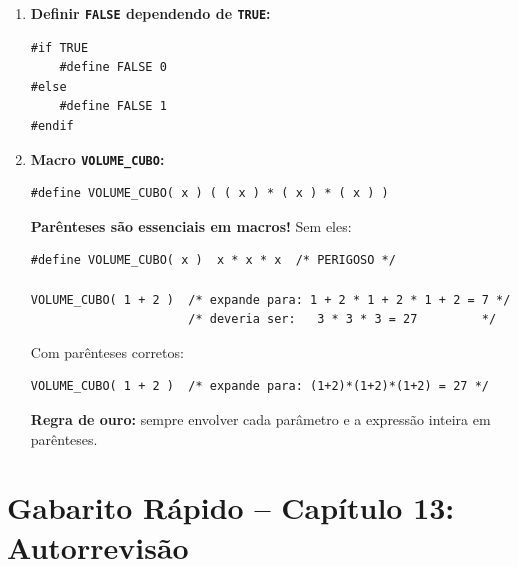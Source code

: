 \documentclass[12pt,a4paper]{article}
\begin{document}
\begin{respostabox}
\begin{enumerate}[label=\textbf{\alph*)}]
\item \textbf{Definir \texttt{FALSE} dependendo de \texttt{TRUE}:}
\begin{lstlisting}
#if TRUE
    #define FALSE 0
#else
    #define FALSE 1
#endif
\end{lstlisting}

\item \textbf{Macro \texttt{VOLUME\_CUBO}:}
\begin{lstlisting}
#define VOLUME_CUBO( x ) ( ( x ) * ( x ) * ( x ) )
\end{lstlisting}

\begin{erroco}
  \textbf{Parênteses são essenciais em macros!} Sem eles:
\begin{lstlisting}
#define VOLUME_CUBO( x )  x * x * x  /* PERIGOSO */

VOLUME_CUBO( 1 + 2 )  /* expande para: 1 + 2 * 1 + 2 * 1 + 2 = 7 */
                      /* deveria ser:   3 * 3 * 3 = 27         */
\end{lstlisting}
Com parênteses corretos:
\begin{lstlisting}
VOLUME_CUBO( 1 + 2 )  /* expande para: (1+2)*(1+2)*(1+2) = 27 */
\end{lstlisting}
\textbf{Regra de ouro:} sempre envolver cada parâmetro e a expressão inteira
em parênteses.
\end{erroco}

\end{enumerate}
\end{respostabox}

\newpage

\section*{Gabarito Rápido -- Capítulo 13: Autorrevisão}
\end{document}

